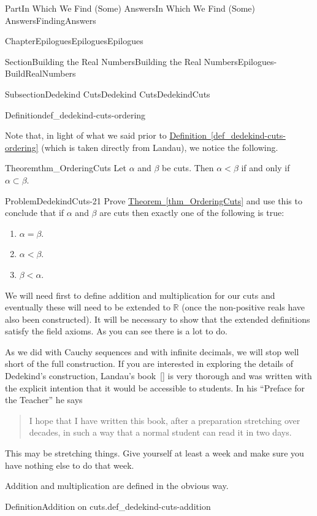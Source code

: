 \documentclass[oneside,10pt,]{book}
\newcommand{\xreffont}{\relax}
\numberwithin{equation}{part}
\newcommand{\RR}{\mathbb {R}}
\newcommand{\lt}{<}
\begin{document}
\begin{partptx}{Part}{In Which We Find (Some) Answers}{}{In Which We Find (Some) Answers}{}{}{FindingAnswers}
\begin{chapterptx}{Chapter}{Epilogues}{}{Epilogues}{}{}{Epilogues}
\begin{sectionptx}{Section}{Building the Real Numbers}{}{Building the Real Numbers}{}{}{Epilogues-BuildRealNumbers}
\begin{subsectionptx}{Subsection}{Dedekind Cuts}{}{Dedekind Cuts}{}{}{DedekindCuts}
\begin{definition}{Definition}{}{def_dedekind-cuts-ordering}
\end{definition}
Note that, in light of what we said prior to \hyperref[def_dedekind-cuts-ordering]{Definition~{\xreffont\ref{def_dedekind-cuts-ordering}}} (which is taken directly from Landau), we notice the following.%
\begin{theorem}{Theorem}{}{}{thm_OrderingCuts}%
%
Let \(\alpha\) and \(\beta\) be cuts.  Then \(\alpha\lt \beta\) if and only if \(\alpha\subset\beta\).%
\end{theorem}
\begin{problem}{Problem}{}{DedekindCuts-21}%
Prove \hyperref[thm_OrderingCuts]{Theorem~{\xreffont\ref{thm_OrderingCuts}}} and use this to conclude that if \(\alpha\) and \(\beta\) are cuts then exactly one of the following is true:%
\begin{enumerate}
\item{}\(\alpha=\beta\).%
\item{}\(\alpha\lt \beta\).%
\item{}\(\beta\lt \alpha\).%
\end{enumerate}
%
\end{problem}
We will need first to define addition and multiplication for our cuts and eventually these will need to be extended to \(\RR\) (once the non-positive reals have also been constructed).  It will be necessary to show that the extended definitions satisfy the field axioms.  As you can see there is a lot to do.%
\par
{} As we did with Cauchy sequences and with infinite decimals, we will stop well short of the full construction.  If you are interested in exploring the details of Dedekind's construction, Landau's book~\hyperlink{landau66__found_analy}{[{\xreffont 7}]} is very thorough and was written with the explicit intention that it would be accessible to students.  In his ``Preface for the Teacher'' he says%
\begin{quote}%
I hope that I have written this book, after a preparation stretching over decades, in such a way that a normal student can read it in two days.%
\end{quote}
This may be stretching things.  Give yourself at least a week and make sure you have nothing else to do that week.%
\par
Addition and multiplication are defined in the obvious way.%
\begin{definition}{Definition}{Addition on cuts.}{def_dedekind-cuts-addition}%
%

\end{definition}
\end{subsectionptx}
\end{sectionptx}
\end{chapterptx}
\end{partptx}
\end{document}
